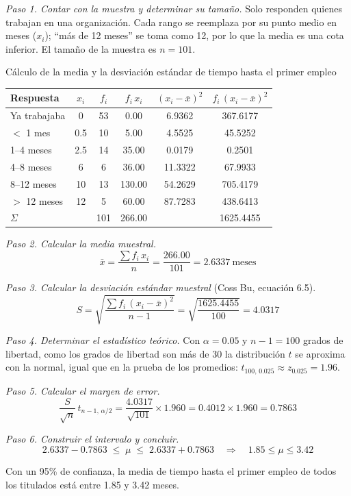 \textit{Paso 1. Contar con la muestra y determinar su tamaño.} Solo responden quienes trabajan en una organización. Cada rango se reemplaza por su punto medio en meses ($x_i$); ``más de 12 meses'' se toma como 12, por lo que la media es una cota inferior. El tamaño de la muestra es $n = 101$.

\begin{mitabla}{Cálculo de la media y la desviación estándar de tiempo hasta el primer empleo}
\begin{tabular}{lccccc}
\toprule
Respuesta & $x_i$ & $f_i$ & $f_i\,x_i$ & $(x_i-\bar{x})^2$ & $f_i\,(x_i-\bar{x})^2$ \\
\midrule
Ya trabajaba & 0 & 53 & 0.00 & 6.9362 & 367.6177 \\
$<$ 1 mes & 0.5 & 10 & 5.00 & 4.5525 & 45.5252 \\
1–4 meses & 2.5 & 14 & 35.00 & 0.0179 & 0.2501 \\
4–8 meses & 6 & 6 & 36.00 & 11.3322 & 67.9933 \\
8–12 meses & 10 & 13 & 130.00 & 54.2629 & 705.4179 \\
$>$ 12 meses & 12 & 5 & 60.00 & 87.7283 & 438.6413 \\
\midrule
$\Sigma$ & & 101 & 266.00 & & 1625.4455 \\
\bottomrule
\end{tabular}
\end{mitabla}

\textit{Paso 2. Calcular la media muestral.}
\[
\bar{x} = \frac{\sum f_i\,x_i}{n} = \frac{266.00}{101} = 2.6337\ \text{meses}
\]

\textit{Paso 3. Calcular la desviación estándar muestral} (Coss Bu, ecuación 6.5).
\[
S = \sqrt{\frac{\sum f_i\,(x_i-\bar{x})^2}{n-1}} = \sqrt{\frac{1625.4455}{100}} = 4.0317
\]

\textit{Paso 4. Determinar el estadístico teórico.} Con $\alpha = 0.05$ y $n-1 = 100$ grados de libertad, como los grados de libertad son más de 30 la distribución $t$ se aproxima con la normal, igual que en la prueba de los promedios: $t_{100,\,0.025} \approx z_{0.025} = 1.96$.

\textit{Paso 5. Calcular el margen de error.}
\[
\frac{S}{\sqrt{n}}\,t_{n-1,\,\alpha/2} = \frac{4.0317}{\sqrt{101}}\times 1.960 = 0.4012 \times 1.960 = 0.7863
\]

\textit{Paso 6. Construir el intervalo y concluir.}
\[
2.6337 - 0.7863 \;\le\; \mu \;\le\; 2.6337 + 0.7863 \quad\Longrightarrow\quad 1.85 \le \mu \le 3.42
\]

Con un 95\% de confianza, la media de tiempo hasta el primer empleo de todos los titulados está entre 1.85 y 3.42 meses.

